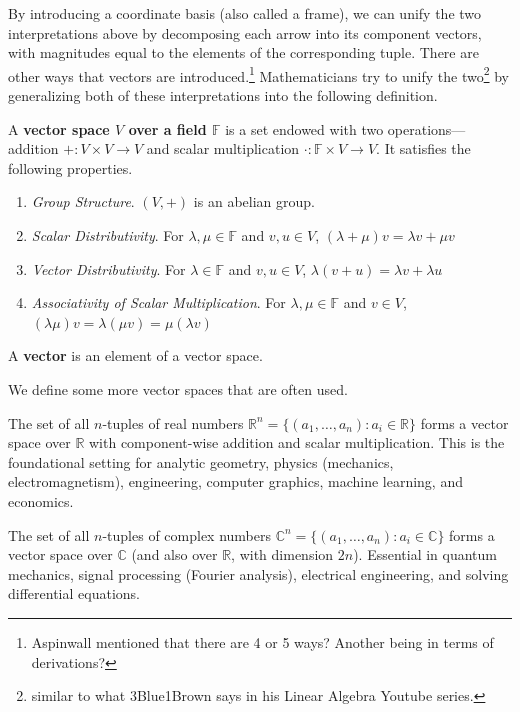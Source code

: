   By introducing a coordinate basis (also called a frame), we can unify the two interpretations above by decomposing each arrow into its component vectors, with magnitudes equal to the elements of the corresponding tuple. There are other ways that vectors are introduced.\footnote{Aspinwall mentioned that there are 4 or 5 ways? Another being in terms of derivations?} Mathematicians try to unify the two\footnote{similar to what 3Blue1Brown says in his Linear Algebra Youtube series.} by generalizing both of these interpretations into the following definition. 

  \begin{definition}
    A \textbf{vector space $V$ over a field $\mathbb{F}$} is a set endowed with two operations---addition $+: V \times V \to V$ and scalar multiplication $\cdot: \mathbb{F} \times V \to V$. It satisfies the following properties. 
    \begin{enumerate}
      \item \textit{Group Structure}. $(V, +)$ is an abelian group. 
      \item \textit{Scalar Distributivity}. For $\lambda, \mu \in \mathbb{F}$ and $v, u \in V$, $(\lambda + \mu) v = \lambda v + \mu v$
      \item \textit{Vector Distributivity}. For $\lambda \in \mathbb{F}$ and $v, u \in V$, $\lambda (v + u) = \lambda v + \lambda u$
      \item \textit{Associativity of Scalar Multiplication}. For $\lambda, \mu \in \mathbb{F}$ and $v \in V$, $(\lambda \mu) v = \lambda (\mu v) = \mu (\lambda v)$ 
    \end{enumerate}
    A \textbf{vector} is an element of a vector space.
  \end{definition} 

  We define some more vector spaces that are often used. 

  \begin{example}[$\mathbb{R}^n$]
    The set of all $n$-tuples of real numbers $\mathbb{R}^n = \{(a_1, \dots, a_n) : a_i \in \mathbb{R}\}$ forms a vector space over $\mathbb{R}$ with component-wise addition and scalar multiplication. This is the foundational setting for analytic geometry, physics (mechanics, electromagnetism), engineering, computer graphics, machine learning, and economics.
  \end{example}

  \begin{example}[$\mathbb{C}^n$]
    The set of all $n$-tuples of complex numbers $\mathbb{C}^n = \{(a_1, \dots, a_n) : a_i \in \mathbb{C}\}$ forms a vector space over $\mathbb{C}$ (and also over $\mathbb{R}$, with dimension $2n$). Essential in quantum mechanics, signal processing (Fourier analysis), electrical engineering, and solving differential equations.
  \end{example}

